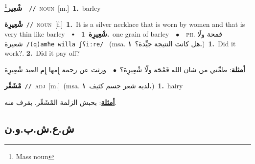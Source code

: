 \documentclass[10pt,a4paper,twoside]{article} %
\begin{document}
\begin{multicols}{2}
{\setlength\topsep{0pt}\textbf{\foreignlanguage{arabic}{شْعِير}}\footnote{Mass noun}\ \ {\color{gray}\texttt{//}\color{black}}\ \textsc{noun}\ [m.]\ \textbf{1.}~barley\ } \vspace{2mm}

{\setlength\topsep{0pt}\textbf{\foreignlanguage{arabic}{شْعِيرِة}}\ {\color{gray}\texttt{//}\color{black}}\ \textsc{noun}\ [f.]\ \textbf{1.}~It is a silver necklace that is worn by women and that is very thin like barley\ \ $\smblkdiamond$\ \ \setlength\topsep{0pt}\textbf{\foreignlanguage{arabic}{شْعِيرِة}}\ \textbf{1.}~one grain of barley\ \ $\bullet$\ \ \textsc{ph.} \color{gray} \foreignlanguage{arabic}{قمحة ولَا شعيرة}\color{black}\ {\color{gray}\texttt{/{\sffamily (q)amħe willa ʃʕiːre}/}\color{black}}\ \color{gray} (msa. \foreignlanguage{arabic}{هل كانت النتيجة جيِّدة؟}~\foreignlanguage{arabic}{\textbf{١.}})\color{black}\ \textbf{1.}~Did it work?.  \textbf{2.}~Did it pay off?\  \begin{flushright}\color{gray}\foreignlanguage{arabic}{\textbf{\underline{\foreignlanguage{arabic}{أمثلة}}}: طمِّني من شان الله قَمْحَة ولّا شْعِيرِة؟\ $\bullet$\ \  ورثت عن رحمة إِمها إِم العبد شْعِيرِة}\end{flushright}\color{black}} \vspace{2mm}

{\setlength\topsep{0pt}\textbf{\foreignlanguage{arabic}{مْشَعِّر}}\ {\color{gray}\texttt{//}\color{black}}\ \textsc{adj}\ [m.]\ \color{gray}(msa. \foreignlanguage{arabic}{لديه شعر جسم كثيف}~\foreignlanguage{arabic}{\textbf{١.}})\color{black}\ \textbf{1.}~hairy\  \begin{flushright}\color{gray}\foreignlanguage{arabic}{\textbf{\underline{\foreignlanguage{arabic}{أمثلة}}}: بحبش الزلمة المْشَعِّر. بقرف منه.}\end{flushright}\color{black}} \vspace{2mm}

\vspace{-3mm}
\subsection*{\color{blue}\foreignlanguage{arabic}{ش.ع.ش.ب.و.ن}\color{blue}{ (ntws)}} 


\end{multicols}
\end{document}
